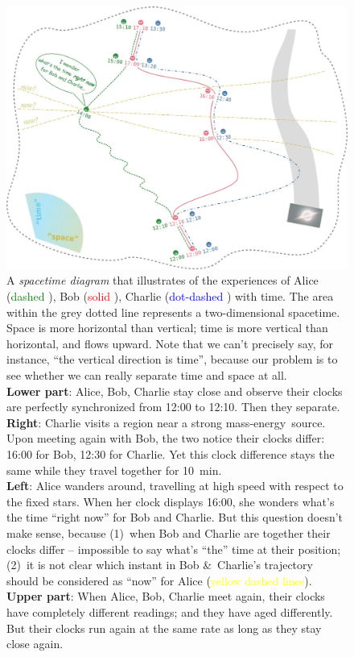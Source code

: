 \documentclass[a4paper,12pt,%
onecolumn,oneside,%
british%
]{memoir}
\newcommand*{\amp}{\&}
\renewcommand*{\|}[1][]{\nonscript\:#1\vert\nonscript\:\mathopen{}}
\newcommand*{\masse}{mass-energy}
\begin{document}
\begin{figure}[p]
  \includegraphics[width=\linewidth]{images/ABC_spacetime.jpg}
  \caption{A \emph{spacetime diagram} that illustrates of the experiences of Alice (\textcolor{green}{dashed }), Bob (\textcolor{red}{solid }), Charlie (\textcolor{blue}{dot-dashed }) with time. The area within the \textcolor{midgrey}{grey dotted line} represents a two-dimensional spacetime. Space is more horizontal than vertical; time is more vertical than horizontal, and flows upward. Note that we can't precisely say, for instance, \enquote{the vertical direction is time}, because our problem is to see whether we can really separate time and space at all.
\\[2\jot]\textbf{Lower part}: Alice, Bob, Charlie stay close and observe their clocks are perfectly synchronized from 12:00 to 12:10. Then they separate.
%
\\[\jot]\textbf{Right}: Charlie visits a region near a strong \masse\ source. Upon meeting again with Bob, the two notice their clocks differ: 16:00 for Bob, 12:30 for Charlie. Yet this clock difference stays the same while they travel together for \qty{10}{min}.
%
\\[\jot]\textbf{Left}: Alice wanders around, travelling at high speed with respect to the fixed stars. When her clock displays 16:00, she wonders what's the time \enquote{right now} for Bob and Charlie. But this question doesn't make sense, because
(1)~when Bob and Charlie are together their clocks differ -- impossible to say what's \enquote{the} time at their position; (2)~it is not clear which instant in Bob \amp\ Charlie's trajectory should be considered as \enquote{now} for Alice (\textcolor{yellow}{yellow dashed lines}).
%
\\[\jot]\textbf{Upper part}: When Alice, Bob, Charlie meet again, their clocks have completely different readings; and they have aged differently. But their clocks run again at the same rate as long as they stay close again.}  \label{fig:ABC_spacetime}
\end{figure}
\end{document}
